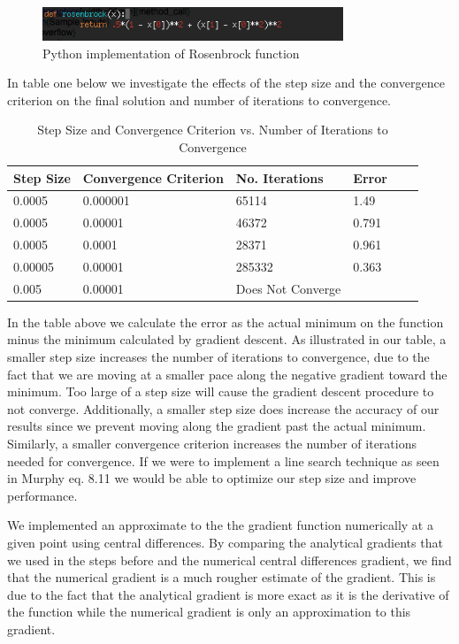 \documentclass[pageno]{jpaper}
\begin{document}
\begin{figure}[ht!]
\centering
\includegraphics[width=90mm]{rosenbrock}
\caption{Python implementation of Rosenbrock function}
\label{overflow}
\end{figure}

In table one below we investigate the effects of the step size and the convergence criterion on the final solution and number of iterations to convergence.
\begin{table}[h!]
  \centering
  \begin{tabular}{llllll|}
    \hline
    \textbf{Step Size}  & \textbf{Convergence Criterion}  & \textbf{No. Iterations} & \textbf{Error}\\
    \hline
    \hline
 0.0005 	&0.000001 &65114  &1.49 \\
 \hline
0.0005	&0.00001 	&46372 &0.791 \\
 \hline
0.0005	&0.0001 	&28371 &0.961 \\
 \hline
0.00005	&0.00001 	&285332 &0.363 \\
 \hline
0.005	&0.00001 	&Does Not Converge \\
 \hline
  \end{tabular}
  \caption{Step Size and Convergence Criterion vs. Number of Iterations to Convergence}
  \label{table:formatting}
\end{table}

In the table above we calculate the error as the actual minimum on the function minus the minimum calculated by gradient descent. 
As illustrated in our table, a smaller step size increases the number of iterations to convergence, due to the fact that we are moving at a smaller pace along the negative gradient toward the minimum. Too large of a step size will cause the gradient descent procedure to not converge. Additionally, a smaller step size does increase the accuracy of our results since we prevent moving along the gradient past the actual minimum. Similarly, a smaller convergence criterion increases the number of iterations needed for convergence. If we were to implement a line search technique as seen in Murphy eq. 8.11 we would be able to optimize our step size and improve performance.

We implemented an approximate to the the gradient function numerically at a given point using central differences. By comparing the analytical gradients that we used in the steps before and the numerical central differences gradient, we find that the numerical gradient is a much rougher estimate of the gradient. This is due to the fact that the analytical gradient is more exact as it is the derivative of the function while the numerical gradient is only an approximation to this gradient.
\end{document}
